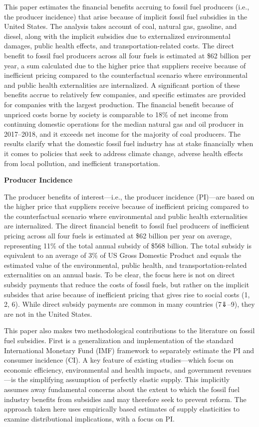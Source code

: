 \documentclass[
]{book}
\begin{document}
This paper estimates the financial benefits accruing to fossil fuel producers (i.e., the producer incidence) that arise because of implicit fossil fuel subsidies in the United States. The analysis takes account of coal, natural gas, gasoline, and diesel, along with the implicit subsidies due to externalized environmental damages, public health effects, and transportation-related costs. The direct benefit to fossil fuel producers across all four fuels is estimated at \$62 billion per year, a sum calculated due to the higher price that suppliers receive because of inefficient pricing compared to the counterfactual scenario where environmental and public health externalities are internalized. A significant portion of these benefits accrue to relatively few companies, and specific estimates are provided for companies with the largest production. The financial benefit because of unpriced costs borne by society is comparable to 18\% of net income from continuing domestic operations for the median natural gas and oil producer in 2017--2018, and it exceeds net income for the majority of coal producers. The results clarify what the domestic fossil fuel industry has at stake financially when it comes to policies that seek to address climate change, adverse health effects from local pollution, and inefficient transportation.

\textbf{Producer Incidence}

The producer benefits of interest---i.e., the producer incidence (PI)---are based on the higher price that suppliers receive because of inefficient pricing compared to the counterfactual scenario where environmental and public health externalities are internalized. The direct financial benefit to fossil fuel producers of inefficient pricing across all four fuels is estimated at \$62 billion per year on average,
representing 11\% of the total annual subsidy of \$568 billion. The total subsidy is equivalent to an average of 3\% of US Gross Domestic Product and equals the estimated value of the environmental, public health, and transportation-related externalities on an annual basis. To be clear, the focus here is not on direct subsidy payments that reduce the costs of fossil fuels, but rather on the implicit subsides that arise because of inefficient pricing that gives rise to social costs (1, 2, 6). While direct subsidy payments are common in many countries (7⇓--9), they are not in the United States.

This paper also makes two methodological contributions to the literature on fossil fuel subsidies. First is a generalization and implementation of the standard International Monetary Fund (IMF) framework to separately estimate the PI and consumer incidence (CI). A key feature of existing studies---which focus on economic efficiency, environmental and health impacts, and government revenues---is the simplifying assumption of perfectly elastic supply. This implicitly assumes away fundamental concerns about the extent to which the fossil fuel industry benefits from subsidies and may therefore seek to prevent reform. The approach taken here uses empirically based estimates of supply elasticities to examine distributional implications, with a focus on PI.
\end{document}
